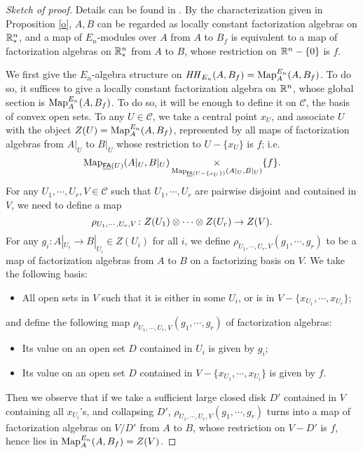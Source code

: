 \documentclass[twoside]{article}
\begin{document}
\begin{proof}[Sketch of proof]
    Details can be found in \cite{GTZ12}. By the
    characterization given in Proposition \ref{o}, $A,B$ can be regarded as
    locally constant factorization algebras on $\mathbb{R}^n_*$, and a map of 
    $E_n$-modules over $A$ from $A$ to $B_f$ is equivalent to a map of factorization
    algebras on $\mathbb{R}^n_*$ from $A$ to $B$, whose restriction on $\mathbb{R}^n-\{0\}$ is 
    $f$.

    We first give the $E_n$-algebra structure on $\mathit{HH}_{E_n}(A,B_f)
    =\operatorname{Map}_A^{E_n}(A,B_f)$. To do so, it suffices to give a locally constant
    factorization algebra on $\mathbb{R}^n$, whose global section is $\operatorname{Map}_A^{E_n}(A,B_f)$.
    To do so, it will be enough to define it on $\mathscr C$, the basis of convex
    open sets. To any $U\in\mathscr C$, we take a central point $x_U$, and associate
    $U$ with the object $Z(U)=\operatorname{Map}_A^{E_n}(A,B_f)$, represented by all maps of
    factorization algebras from $A|_U$ to $B|_U$ whose restriction to $U-\{x_U\}$
    is $f$; i.e. $$\operatorname{Map}_{\underline{\smash{\mathsf{FA}}}(U)}(A|_U,B|_U)\mathop{\operatorname{\times}}\limits
    _{\operatorname{Map}_{\underline{\smash{\mathsf{FA}}}(U-\{x_U\})}(A|_U,B|_U)}\{f\}.$$ For any $U_1,\cdots,U_r,V
    \in\mathscr C$ such that $U_1,\cdots,U_r$ are pairwise disjoint and contained in
    $V$, we need to define a map $$\rho_{U_1,\cdots,U_r,V}\colon Z(U_1)\otimes\cdots\otimes Z(U_r)
    \to Z(V).$$ For any $g_i:A|_{U_i}\to B|_{U_i}\in Z(U_i)$ for all $i$,
    we define $\rho_{U_1,\cdots,U_r,V}(g_1,\cdots,g_r)$ to be a map of factorization
    algebras from $A$ to $B$ on a factorizing basis on $V$. We take the following
    basis:

    \begin{itemize}
        \item All open sets in $V$ such that it is either in some $U_i$, or is in
        $V-\{x_{U_1},\cdots,x_{U_r}\}$;
    \end{itemize}

    and define the following map $\rho_{U_1,\cdots,U_r,V}(g_1,\cdots,g_r)$
    of factorization algebras:
    
    \begin{itemize}
        \item Its value on an open set $D$ contained in $U_i$ is given by $g_i$;
        \item Its value on an open set $D$ contained in $V-\{x_{U_1},\cdots,x_{U_i}\}$
        is given by $f$.
    \end{itemize}

    Then we observe that if we take a sufficient large closed disk $D'$ contained in
    $V$ containing all $x_{U_i}$'s, and collapsing $D'$, $\rho_{U_1,\cdots,U_r,V}
    (g_1,\cdots,g_r)$ turns into a map of factorization algebras on $V/D'$
    from $A$ to $B$, whose restriction on $V-D'$ is $f$, hence lies in 
    $\operatorname{Map}_A^{E_n}(A,B_f)=Z(V)$.


\end{proof}
\end{document}
